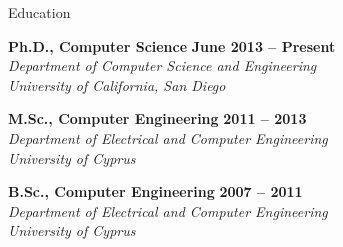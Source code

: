 \documentclass{resume} %
\begin{document}

\begin{rSection}{Education}

{\bf Ph.D., Computer Science} \hfill {\bf June 2013 -- Present} \\
\em Department of Computer Science and Engineering \\
\em University of California, San Diego 

{\bf M.Sc., Computer Engineering} \hfill {\bf 2011 -- 2013} \\
\em Department of Electrical and Computer Engineering \\
\em University of Cyprus 

{\bf B.Sc., Computer Engineering} \hfill {\bf 2007 -- 2011} \\
\em Department of Electrical and Computer Engineering \\
\em University of Cyprus 

\end{rSection}

\end{document}
